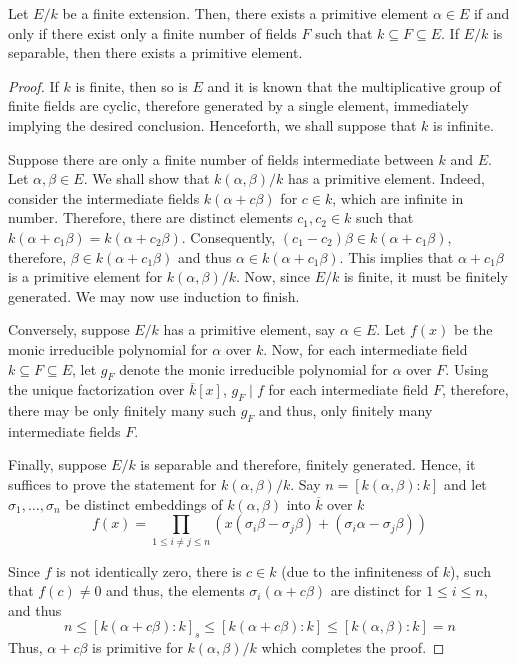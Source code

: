 \begin{theorem}[Steinitz, 1910]
    Let $E/k$ be a finite extension. Then, there exists a primitive element $\alpha\in E$ if and only if there exist only a finite number of fields $F$ such that $k\subseteq F\subseteq E$. If $E/k$ is separable, then there exists a primitive element.
\end{theorem}
\begin{proof}
    If $k$ is finite, then so is $E$ and it is known that the multiplicative group of finite fields are cyclic, therefore generated by a single element, immediately implying the desired conclusion. Henceforth, we shall suppose that $k$ is infinite.

    Suppose there are only a finite number of fields intermediate between $k$ and $E$. Let $\alpha,\beta\in E$. We shall show that $k(\alpha,\beta)/k$ has a primitive element. Indeed, consider the intermediate fields $k(\alpha + c\beta)$ for $c\in k$, which are infinite in number. Therefore, there are distinct elements $c_1,c_2\in k$ such that $k(\alpha + c_1\beta) = k(\alpha + c_2\beta)$. Consequently, $(c_1 - c_2)\beta\in k(\alpha + c_1\beta)$, therefore, $\beta\in k(\alpha + c_1\beta)$ and thus $\alpha\in k(\alpha + c_1\beta)$. This implies that $\alpha + c_1\beta$ is a primitive element for $k(\alpha,\beta)/k$. Now, since $E/k$ is finite, it must be finitely generated. We may now use induction to finish.

    Conversely, suppose $E/k$ has a primitive element, say $\alpha\in E$. Let $f(x)$ be the monic irreducible polynomial for $\alpha$ over $k$. Now, for each intermediate field $k\subseteq F\subseteq E$, let $g_F$ denote the monic irreducible polynomial for $\alpha$ over $F$. Using the unique factorization over $\overline{k}[x]$, $g_F\mid f$ for each intermediate field $F$, therefore, there may be only finitely many such $g_F$ and thus, only finitely many intermediate fields $F$.

    Finally, suppose $E/k$ is separable and therefore, finitely generated. Hence, it suffices to prove the statement for $k(\alpha, \beta)/k$. Say $n = [k(\alpha, \beta): k]$ and let $\sigma_1,\ldots,\sigma_n$ be distinct embeddings of $k(\alpha,\beta)$ into $\overline{k}$ over $k$
    \begin{equation*}
        f(x) = \prod_{1\le i\ne j\le n}\left(x(\sigma_i\beta - \sigma_j\beta) + (\sigma_i\alpha - \sigma_j\beta)\right)
    \end{equation*}

    Since $f$ is not identically zero, there is $c\in k$ (due to the infiniteness of $k$), such that $f(c)\ne 0$ and thus, the elements $\sigma_i(\alpha + c\beta)$ are distinct for $1\le i\le n$, and thus
    \begin{equation*}
        n\le[k(\alpha + c\beta): k]_s\le [k(\alpha + c\beta): k]\le[k(\alpha,\beta): k] = n
    \end{equation*}
    Thus, $\alpha + c\beta$ is primitive for $k(\alpha,\beta)/k$ which completes the proof.
\end{proof}

